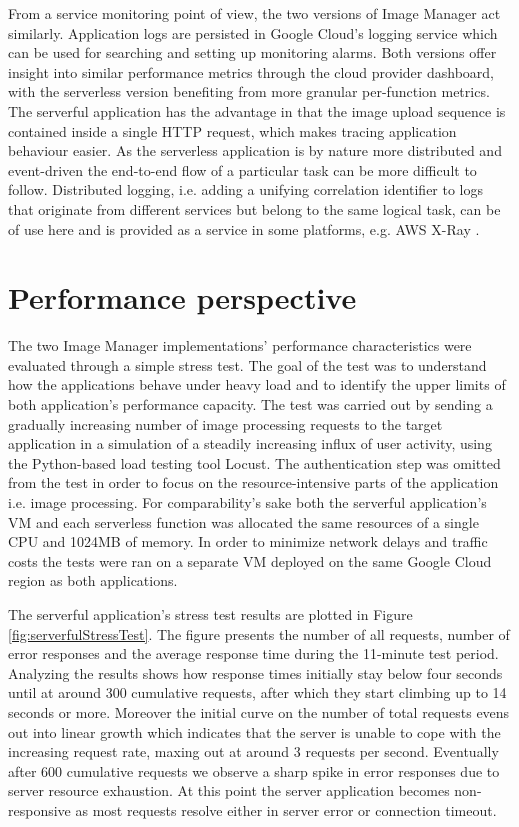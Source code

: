 From a service monitoring point of view, the two versions of Image Manager act similarly. Application logs are persisted in Google Cloud's logging service which can be used for searching and setting up monitoring alarms. Both versions offer insight into similar performance metrics through the cloud provider dashboard, with the serverless version benefiting from more granular per-function metrics. The serverful application has the advantage in that the image upload sequence is contained inside a single HTTP request, which makes tracing application behaviour easier. As the serverless application is by nature more distributed and event-driven the end-to-end flow of a particular task can be more difficult to follow. Distributed logging, i.e. adding a unifying correlation identifier to logs that originate from different services but belong to the same logical task, can be of use here and is provided as a service in some platforms, e.g. AWS X-Ray \parencite{awslambda0218}.

\section{Performance perspective}

The two Image Manager implementations' performance characteristics were evaluated through a simple stress test. The goal of the test was to understand how the applications behave under heavy load and to identify the upper limits of both application's performance capacity. The test was carried out by sending a gradually increasing number of image processing requests to the target application in a simulation of a steadily increasing influx of user activity, using the Python-based load testing tool Locust. The authentication step was omitted from the test in order to focus on the resource-intensive parts of the application i.e. image processing. For comparability's sake both the serverful application's VM and each serverless function was allocated the same resources of a single CPU and 1024MB of memory. In order to minimize network delays and traffic costs the tests were ran on a separate VM deployed on the same Google Cloud region as both applications.

The serverful application's stress test results are plotted in Figure \ref{fig:serverfulStressTest}. The figure presents the number of all requests, number of error responses and the average response time during the 11-minute test period. Analyzing the results shows how response times initially stay below four seconds until at around 300 cumulative requests, after which they start climbing up to 14 seconds or more. Moreover the initial curve on the number of total requests evens out into linear growth which indicates that the server is unable to cope with the increasing request rate, maxing out at around 3 requests per second. Eventually after 600 cumulative requests we observe a sharp spike in error responses due to server resource exhaustion. At this point the server application becomes non-responsive as most requests resolve either in server error or connection timeout.

